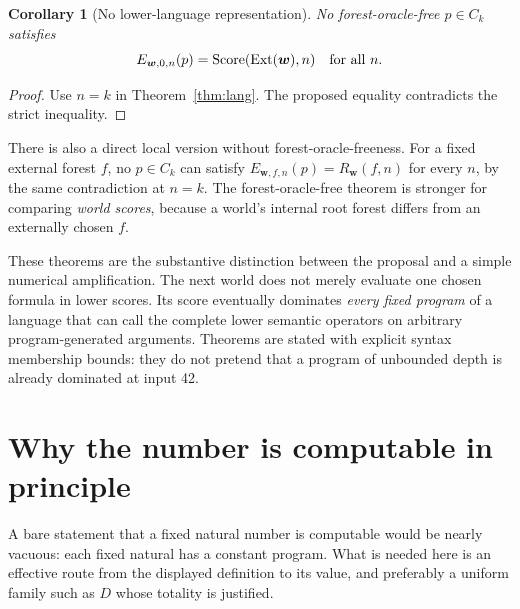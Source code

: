 \documentclass[11pt]{article}
\newtheorem{corollary}[theorem]{Corollary}
\theoremstyle{definition}
\theoremstyle{remark}
\newcommand{\Score}{\operatorname{Score}}
\newcommand{\Ext}{\operatorname{Ext}}
\newcommand{\ctx}{\boldsymbol w}
\begin{document}
\begin{corollary}[No lower-language representation]\label{cor:lang}
No forest-oracle-free $p\in C_k$ satisfies
\[
       E_{\ctx,0,n}(p)=\Score(\Ext(\ctx),n)\quad\hbox{for all }n.
\]
\end{corollary}
\begin{proof}
Use $n=k$ in Theorem~\ref{thm:lang}. The proposed equality contradicts the
strict inequality.
\end{proof}

There is also a direct local version without forest-oracle-freeness. For a
fixed external forest $f$, no $p\in C_k$ can satisfy
$E_{\ctx,f,n}(p)=R_{\ctx}(f,n)$ for every $n$, by the same contradiction at
$n=k$. The forest-oracle-free theorem is stronger for comparing \emph{world
scores}, because a world's internal root forest differs from an externally
chosen $f$.

These theorems are the substantive distinction between the proposal and a
simple numerical amplification. The next world does not merely evaluate one
chosen formula in lower scores. Its score eventually dominates \emph{every
fixed program} of a language that can call the complete lower semantic
operators on arbitrary program-generated arguments. Theorems are stated with
explicit syntax membership bounds: they do not pretend that a program of
unbounded depth is already dominated at input 42.

\section{Why the number is computable in principle}\label{sec:computability}

A bare statement that a fixed natural number is computable would be nearly
vacuous: each fixed natural has a constant program. What is needed here is an
effective route from the displayed definition to its value, and preferably
a uniform family such as $D$ whose totality is justified.
\end{document}
